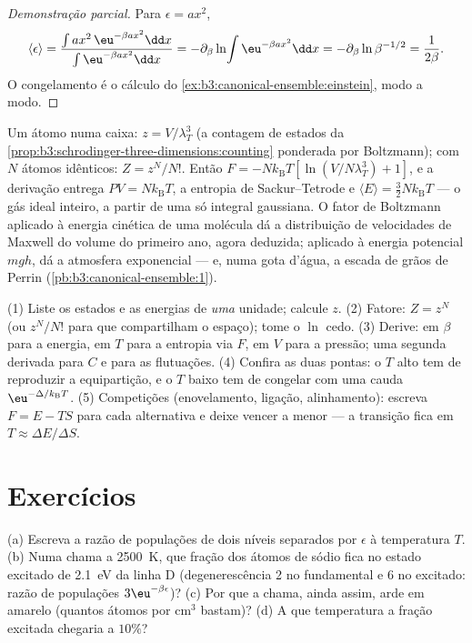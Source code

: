 \begin{proof}[Demonstração parcial]
Para $\epsilon = ax^2$,
\[
\langle\epsilon\rangle
 = \frac{\int ax^2\,\eu^{-\beta ax^2}\dd x}
        {\int\eu^{-\beta ax^2}\dd x}
 = -\partial_\beta\ln\!\int\eu^{-\beta ax^2}\dd x
 = -\partial_\beta\ln\beta^{-1/2} = \frac{1}{2\beta} .
\] O congelamento é o cálculo do
\cref{ex:b3:canonical-ensemble:einstein}, modo a modo.
\end{proof}

\begin{example}\label{ex:b3:canonical-ensemble:gas}
Um átomo numa caixa: $z = V/\lambda_T^3$ (a contagem de estados da
\cref{prop:b3:schrodinger-three-dimensions:counting} ponderada por
Boltzmann); com $N$ átomos idênticos: $Z = z^N/N!$. Então $F =
-Nk_{\text{B}}T[\ln(V/N\lambda_T^3) + 1]$, e a derivação entrega
$PV = Nk_{\text{B}}T$, a entropia de Sackur--Tetrode e
$\langle E\rangle = \tfrac32 Nk_{\text{B}}T$ --- o gás ideal inteiro,
a partir de uma só integral gaussiana. O fator de Boltzmann aplicado à
energia cinética de uma molécula dá a distribuição de velocidades de
Maxwell do volume do primeiro ano, agora deduzida; aplicado à energia
potencial $mgh$, dá a atmosfera exponencial --- e, numa gota d'água, a
escada de grãos de Perrin (\cref{pb:b3:canonical-ensemble:1}).
\end{example}

\begin{method}\label{met:b3:canonical-ensemble:method}
(1) Liste os estados e as energias de \emph{uma} unidade; calcule $z$.
(2) Fatore: $Z = z^N$ (ou $z^N/N!$ para  que
compartilham o espaço); tome o $\ln$ cedo. (3) Derive: em $\beta$ para
a energia, em $T$ para a entropia via $F$, em $V$ para a pressão; uma
segunda derivada para $C$ e para as flutuações. (4) Confira as duas
pontas: o $T$ alto tem de reproduzir a equipartição, e o $T$ baixo tem
de congelar com uma cauda $\eu^{-\Delta/k_{\text{B}}T}$. (5)
Competições (enovelamento, ligação, alinhamento): escreva
$F = E - TS$ para cada alternativa e deixe vencer a menor --- a
transição fica em $T \approx \Delta
E/\Delta S$.
\end{method}

\section{Exercícios}

\begin{exercise}[$\star$]\label{exo:b3:canonical-ensemble:1}
(a) Escreva a razão de populações de dois níveis separados por
$\epsilon$ à temperatura $T$. (b) Numa chama a \qty{2500}{K}, que
fração dos átomos de sódio fica no estado excitado de \qty{2.1}{eV} da
linha D (degenerescência 2 no fundamental e 6 no excitado: razão de
populações $3\eu^{-\beta\epsilon}$)?
(c) Por que a chama, ainda assim, arde em amarelo (quantos átomos por
cm$^3$ bastam)? (d) A que temperatura a fração excitada chegaria a
$10\%$?
\end{exercise}

